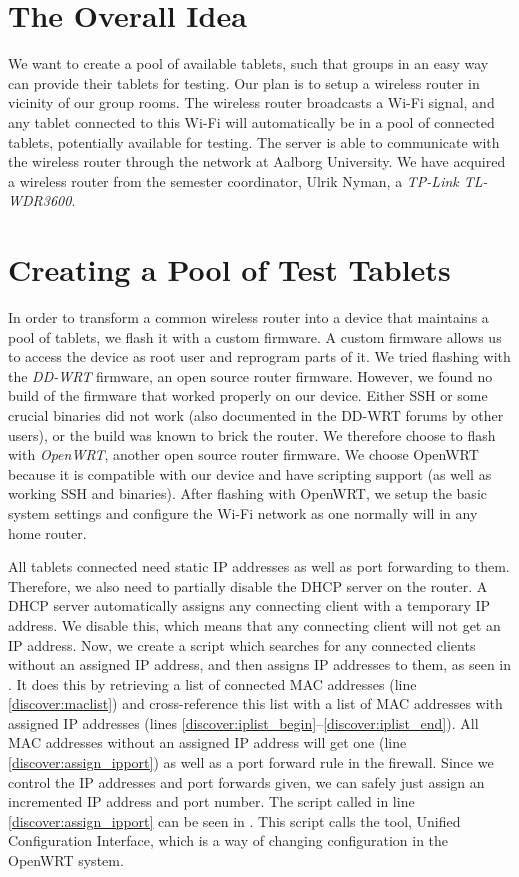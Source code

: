\section{The Overall Idea}
We want to create a pool of available tablets, such that groups in an easy way can provide their tablets for testing. Our plan is to setup a wireless router in vicinity of our group rooms. The wireless router broadcasts a Wi-Fi signal, and any tablet connected to this Wi-Fi will automatically be in a pool of connected tablets, potentially available for testing. The server is able to communicate with the wireless router through the network at Aalborg University. We have acquired a wireless router from the semester coordinator, Ulrik Nyman, a \emph{TP-Link TL-WDR3600}.

\section{Creating a Pool of Test Tablets}\label{sec:pool_of_tablets}
In order to transform a common wireless router into a device that maintains a pool of tablets, we flash it with a custom firmware. A custom firmware allows us to access the device as root user and reprogram parts of it. We tried flashing with the \emph{DD-WRT}\parencite{ddwrt} firmware, an open source router firmware. However, we found no build of the firmware that worked properly on our device. Either SSH or some crucial binaries did not work (also documented in the DD-WRT forums by other users), or the build was known to brick the router. We therefore choose to flash with \emph{OpenWRT}\parencite{openwrt}, another open source router firmware. We choose OpenWRT because it is compatible with our device and have scripting support (as well as working SSH and binaries). After flashing with OpenWRT, we setup the basic system settings and configure the Wi-Fi network as one normally will in any home router.

All tablets connected need static IP addresses as well as port forwarding to them. Therefore, we also need to partially disable the DHCP server on the router. A DHCP server automatically assigns any connecting client with a temporary IP address. We disable this, which means that any connecting client will not get an IP address. Now, we create a script which searches for any connected clients without an assigned IP address, and then assigns IP addresses to them, as seen in . It does this by retrieving a list of connected MAC addresses (line \ref{discover:maclist}) and cross-reference this list with a list of MAC addresses with assigned IP addresses (lines \ref{discover:iplist_begin}--\ref{discover:iplist_end}). All MAC addresses without an assigned IP address will get one (line \ref{discover:assign_ipport}) as well as a port forward rule in the firewall. Since we control the IP addresses and port forwards given, we can safely just assign an incremented IP address and port number. The script called in line \ref{discover:assign_ipport} can be seen in . This script calls the  tool, Unified Configuration Interface, which is a way of changing configuration in the OpenWRT system.

